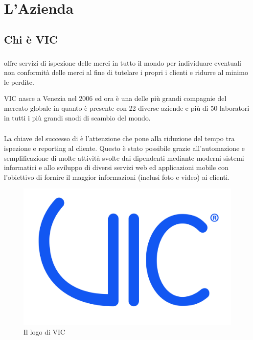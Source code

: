 
\chapter{L'Azienda}
\label{cap:azienda}



\section{Chi è VIC}
	\paragraph{} 
	\vic{}\cite{site:vic} offre servizi di ispezione delle merci in tutto il mondo per individuare eventuali non conformità delle merci 
	al fine di tutelare i propri i clienti e ridurre al minimo le perdite.
	
	VIC nasce a Venezia nel 2006 ed ora è una delle più grandi compagnie del mercato globale in quanto 
	è presente con 22 diverse aziende e più di 50 laboratori in tutti i più grandi snodi di scambio del mondo.
	
	\paragraph{} La chiave del successo di \vic{} è l'attenzione che pone alla riduzione del tempo tra ispezione e reporting al cliente. 
	Questo è stato possibile grazie all'automazione e semplificazione di molte attività svolte dai dipendenti mediante moderni sistemi
	informatici e allo sviluppo di diversi servizi web ed applicazioni mobile con l’obiettivo di fornire il maggior informazioni (inclusi foto e video) ai clienti.
	
	
	\begin{figure}[ht]
		\centering
		\includegraphics[width=0.5\linewidth]{immagini/logo-vic}
		\caption{Il logo di VIC}
		\label{fig:logo-vic}
	\end{figure}
	 

